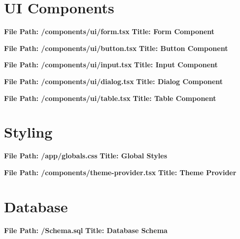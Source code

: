 \documentclass[12pt,a4paper]{book}
\begin{document}
\section{UI Components}

\noindent\textbf{File Path: /components/ui/form.tsx}
\noindent\textbf{Title: Form Component}


\noindent\textbf{File Path: /components/ui/button.tsx}
\noindent\textbf{Title: Button Component}


\noindent\textbf{File Path: /components/ui/input.tsx}
\noindent\textbf{Title: Input Component}


\noindent\textbf{File Path: /components/ui/dialog.tsx}
\noindent\textbf{Title: Dialog Component}


\noindent\textbf{File Path: /components/ui/table.tsx}
\noindent\textbf{Title: Table Component}


\section{Styling}

\noindent\textbf{File Path: /app/globals.css}
\noindent\textbf{Title: Global Styles}


\noindent\textbf{File Path: /components/theme-provider.tsx}
\noindent\textbf{Title: Theme Provider}


\section{Database}

\noindent\textbf{File Path: /Schema.sql}
\noindent\textbf{Title: Database Schema}

\end{document}
